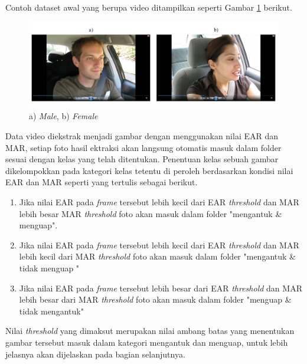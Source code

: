     Contoh dataset awal yang berupa video ditampilkan seperti Gambar \ref{Dataset Video} berikut.

     \begin{figure}[H]
         \centering
             \centering
             \includegraphics[width=\textwidth]{figures/bab4/data video.png}
             \caption{a) \textit{Male}, b) \textit{Female}}
             \label{Dataset Video}
     \end{figure}


    Data video diekstrak menjadi gambar dengan menggunakan nilai EAR dan MAR, setiap foto hasil ektraksi akan langsung otomatis masuk dalam folder sesuai dengan kelas yang telah ditentukan. Penentuan kelas sebuah gambar dikelompokkan pada kategori kelas tetentu di peroleh berdasarkan kondisi nilai EAR dan MAR seperti yang tertulis sebagai berikut.

    \begin{enumerate}
        \item    Jika nilai EAR pada \textit{frame} tersebut lebih kecil dari EAR \textit{threshold} dan MAR lebih besar MAR \textit{threshold} foto akan masuk dalam folder "mengantuk \& menguap".

        \item Jika nilai EAR pada \textit{frame} tersebut lebih kecil dari EAR \textit{threshold} dan MAR lebih kecil
    dari MAR \textit{threshold} foto akan masuk dalam folder "mengantuk \& tidak menguap "


     \item  Jika nilai EAR pada \textit{frame} tersebut lebih besar dari EAR \textit{threshold} dan MAR lebih besar
    dari MAR \textit{threshold} foto akan masuk dalam folder "menguap \& tidak mengantuk"


    \end{enumerate}

Nilai \textit{threshold} yang dimaksut merupakan nilai ambang batas  yang menentukan gambar tersebut masuk 
dalam kategori mengantuk dan menguap, untuk lebih jelasnya akan dijelaskan pada bagian selanjutnya.
     

